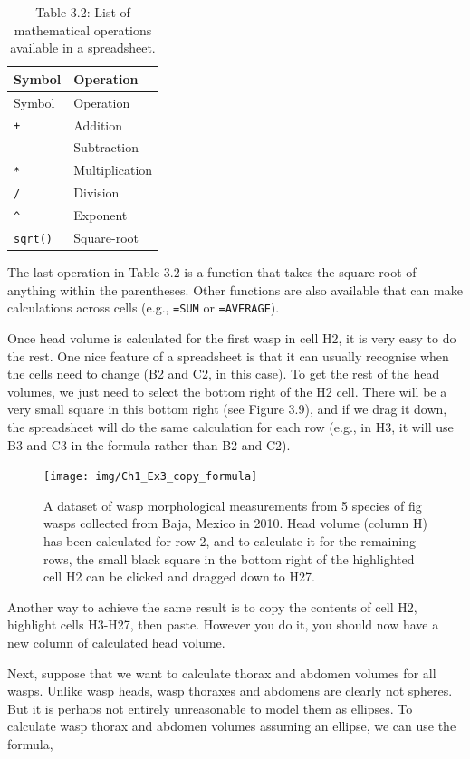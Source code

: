 \documentclass[
]{scrbook}
\begin{document}
\begin{longtable}[]{@{}ll@{}}
\caption{Table 3.2: List of mathematical operations available in a spreadsheet.}\tabularnewline
\toprule
Symbol & Operation \\
\midrule
\endfirsthead
\toprule
Symbol & Operation \\
\midrule
\endhead
\texttt{+} & Addition \\
\texttt{-} & Subtraction \\
\texttt{*} & Multiplication \\
\texttt{/} & Division \\
\texttt{\^{}} & Exponent \\
\texttt{sqrt()} & Square-root \\
\bottomrule
\end{longtable}

The last operation in Table 3.2 is a function that takes the square-root of anything within the parentheses.
Other functions are also available that can make calculations across cells (e.g., \texttt{=SUM} or \texttt{=AVERAGE}).

Once head volume is calculated for the first wasp in cell H2, it is very easy to do the rest.
One nice feature of a spreadsheet is that it can usually recognise when the cells need to change (B2 and C2, in this case).
To get the rest of the head volumes, we just need to select the bottom right of the H2 cell.
There will be a very small square in this bottom right (see Figure 3.9), and if we drag it down, the spreadsheet will do the same calculation for each row (e.g., in H3, it will use B3 and C3 in the formula rather than B2 and C2).

\begin{figure}
\texttt{[image: img/Ch1\_Ex3\_copy\_formula]} \caption{A dataset of wasp morphological measurements from 5 species of fig wasps collected from Baja, Mexico in 2010. Head volume (column H) has been calculated for row 2, and to calculate it for the remaining rows, the small black square in the bottom right of the highlighted cell H2 can be clicked and dragged down to H27.}\label{fig:unnamed-chunk-20}
\end{figure}

Another way to achieve the same result is to copy the contents of cell H2, highlight cells H3-H27, then paste.
However you do it, you should now have a new column of calculated head volume.

Next, suppose that we want to calculate thorax and abdomen volumes for all wasps.
Unlike wasp heads, wasp thoraxes and abdomens are clearly not spheres.
But it is perhaps not entirely unreasonable to model them as ellipses.
To calculate wasp thorax and abdomen volumes assuming an ellipse, we can use the formula,
\end{document}
